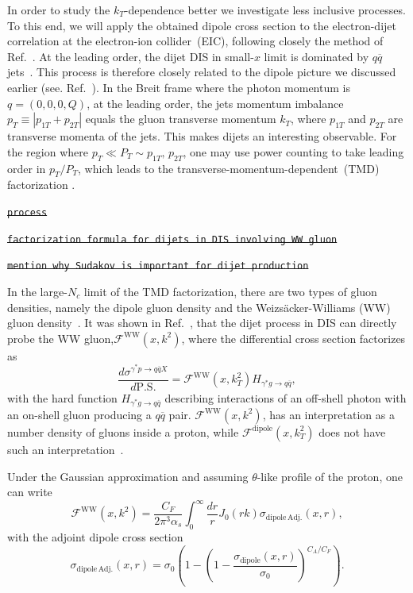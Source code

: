 \documentclass[11pt]{article}
\numberwithin{equation}{section}
\numberwithin{table}{section}
\numberwithin{figure}{section}
\newcommand{\fww}[0]{\mathcal{F}^{\mathrm{WW}}}
\newcommand{\fdp}[0]{\mathcal{F}^{\mathrm{dipole}}}
\newcommand{\sdp}[0]{\sigma_{\mathrm{dipole}}}
\newcommand{\sdpa}[0]{\sigma_{\mathrm{dipole\,Adj.}}}
\newcommand{\comment}[1]{\texttt{\color{red}#1}}
\begin{document}
In order to study the $k_T$-dependence better we investigate less inclusive processes. To this end, we will apply the obtained dipole cross section to the electron-dijet correlation at the electron-ion collider~(EIC), following closely the method of Ref.~\cite{vanHameren:2021sqc}. 
At the leading order, the dijet DIS in small-$x$ limit is dominated by $q\overline{q}$ jets~\cite{}.
This process is therefore closely related to the dipole picture we discussed earlier (see. Ref.~\cite{Dominguez:2011wm}). In the Breit frame where the photon momentum is $q=(0,0,0,Q)$, at the leading order, the jets momentum imbalance $p_T\equiv\left|p_{1T}+p_{2T}\right|$ equals the gluon transverse momentum $k_T$, where $p_{1T}$ and $p_{2T}$ are transverse momenta of the jets.
This makes dijets an interesting observable. For the region where $p_T\ll P_T\sim p_{1T},\,p_{2T}$, one may use power counting to take leading order in $p_T/P_T$, which leads to the transverse-momentum-dependent~(TMD) factorization .
  
\sout{\comment{process}}

\sout{\comment{factorization formula for dijets in DIS involving WW gluon}}

\sout{\comment{mention why Sudakov is important for dijet production}}

In the large-$N_c$ limit of the TMD factorization, there are two types of gluon densities, namely the dipole gluon density and the Weizs\"acker-Williams (WW) gluon density~\cite{Dominguez:2010xd,Dominguez:2011wm,vanHameren:2016ftb,Xiao:2017ggh}.  
It was shown in Ref.~\cite{Dominguez:2011wm}, that the dijet process in DIS can directly probe the WW gluon,$\fww(x,k^2)$, where the differential cross section factorizes as
\begin{equation}
	\frac{d\sigma^{\gamma^*p\rightarrow q\overline{q}X}}{d \mathrm{P.S.}}=\fww(x,k_T^2)H_{\gamma^*g\rightarrow q\overline{q}},
        \label{eq:TMD}
\end{equation}
with the hard function $H_{\gamma^*g\rightarrow q\overline{q}}$ describing interactions of an off-shell photon with an on-shell gluon producing a $q\overline{q}$ pair.
$\fww(x,k^2)$, has an interpretation as a number density of gluons inside a proton, while $\fdp(x,k_T^2)$ does not have such an interpretation~\cite{Dominguez:2010xd,Dominguez:2011wm,Xiao:2017ggh}. 

Under the Gaussian approximation and assuming $\theta$-like profile of the proton, one can write~\cite{vanHameren:2016ftb,Xiao:2017ggh,Dominguez:2010xd,Dominguez:2011wm}
\begin{equation}
\fww(x,k^2)= \frac{C_F}{2\pi^3\alpha_s}\int^\infty_0\frac{dr}{r}J_0(r k) \sdpa(x,r),
\end{equation} 	
with the adjoint dipole cross section
\begin{equation}
\sdpa(x,r)=\sigma_0\left( 1-\left(1-\frac{\sdp(x,r)}{\sigma_0}\right)^{C_A/C_F}\right).
\label{eq:ww}
\end{equation}
\end{document}

